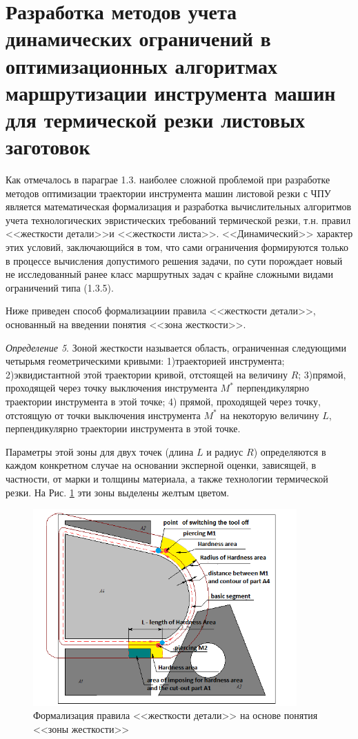 \documentclass[11pt,twoside,openany]{report}
\begin{document}
\section{Разработка методов учета динамических ограничений
  в оптимизационных алгоритмах маршрутизации инструмента машин для термической резки листовых заготовок}

Как отмечалось в параграе 1.3.
наиболее сложной проблемой при разработке методов оптимизации
траектории инструмента машин листовой резки с ЧПУ
является математическая формализация и
разработка вычислительных алгоритмов учета
технологических эвристических требований термической резки,
т.н. правил <<жесткости детали>>и <<жесткости листа>>.
<<Динамический>> характер этих условий, заключающийся в том,
что сами ограничения формируются только в процессе вычисления
допустимого решения задачи, по сути порождает
новый не исследованный ранее класс маршрутных задач
с крайне сложными видами ограничений типа (1.3.5).

Ниже приведен способ формализациии правила <<жесткости детали>>,
основанный на введении понятия <<зона жесткости>>.

{\it Определение 5}.
Зоной жесткости называется область,
ограниченная следующими четырьмя геометрическими кривыми:
1)траекторией инструмента;
2)эквидистантной этой траектории кривой, отстоящей на величину $R$;
3)прямой, проходящей через точку выключения инструмента $M^*$
перпендикулярно траектории инструмента в этой точке;
4) прямой, проходящей через точку,
отстоящую от точки выключения инструмента $M^*$ на некоторую величину $L$,
перпендикулярно траектории инструмента в этой точке.

Параметры этой зоны для двух точек
(длина $L$ и радиус $R$)
определяются в каждом конкретном случае
на основании эксперной оценки,
зависящей, в частности, от марки и толщины материала,
а также технологии термической резки.
На Рис. \ref{hardness-area}
эти зоны выделены желтым цветом.

\begin{figure}
 \begin{center}
  \includegraphics[width=0.9\textwidth]{hardness-area.png}
  \caption{Формализация правила <<жесткости детали>> на основе понятия <<зоны жесткости>>}
  \label{hardness-area}
  \end{center}
\end{figure}
\end{document}
